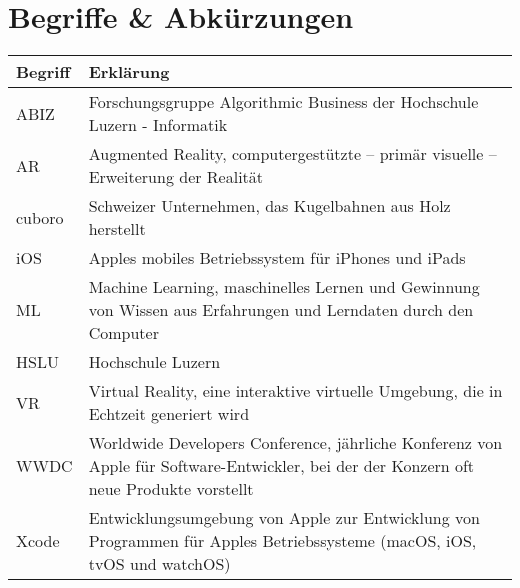 \section*{Begriffe \& Abkürzungen}
\begin{table}
	\begin{tabular}{@{} p{} p{} @{}}
		\hline
		\textbf{Begriff} & \textbf{Erklärung} \\
		\hline
		ABIZ	& Forschungsgruppe Algorithmic Business der Hochschule Luzern - Informatik \\
		AR 		& Augmented Reality, computergestützte – primär visuelle – Erweiterung der Realität \\
		cuboro	& Schweizer Unternehmen, das Kugelbahnen aus Holz herstellt \\
		iOS		& Apples mobiles Betriebssystem für iPhones und iPads \\
		ML		& Machine Learning, maschinelles Lernen und Gewinnung von Wissen aus Erfahrungen und Lerndaten durch den Computer \\
		HSLU	& Hochschule Luzern \\
		VR		& Virtual Reality, eine interaktive virtuelle Umgebung, die in Echtzeit generiert wird \\
		WWDC	& Worldwide Developers Conference, jährliche Konferenz von Apple für Software-Entwickler, bei der der Konzern oft neue Produkte vorstellt \\
		Xcode	& Entwicklungsumgebung von Apple zur Entwicklung von Programmen für Apples Betriebssysteme (macOS, iOS, tvOS und watchOS) \\
		\hline
	\end{tabular}
\end{table}
